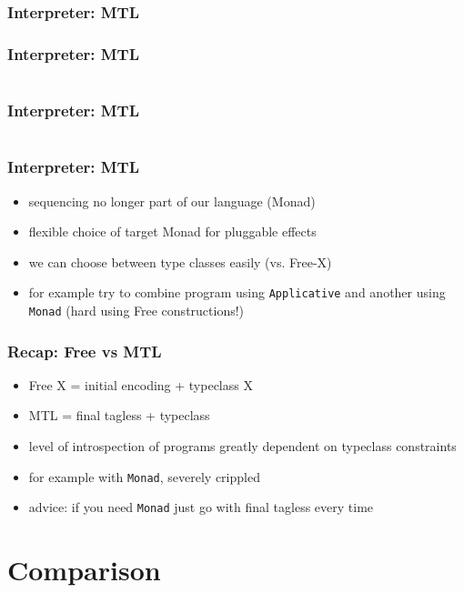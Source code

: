 \documentclass[aspectratio=169, hyperref={colorlinks, linkcolor=beamer@centricgreen}, urlcolor=links]{beamer}
\begin{document}
\begin{frame}
  \frametitle{Interpreter: MTL}
\end{frame}

\begin{frame}
  \frametitle{Interpreter: MTL}
  \inputminted[fontsize=\footnotesize]{scala}{snippets/final-mtl-sample.scala}
\end{frame}

\begin{frame}
  \frametitle{Interpreter: MTL}
  \inputminted[fontsize=\footnotesize]{scala}{snippets/final-mtl-interp.scala}
\end{frame}

\begin{frame}
  \frametitle{Interpreter: MTL}
  \begin{itemize}
  \item sequencing no longer part of our language (Monad)
  \item flexible choice of target Monad for pluggable effects
  \item we can choose between type classes easily (vs. Free-X)
  \item for example try to combine program using \texttt{Applicative}
    and another using \texttt{Monad} (hard using Free constructions!)
  \end{itemize}
\end{frame}

\begin{frame}
  \frametitle{Recap: Free vs MTL}
  \begin{itemize}
  \item Free X = initial encoding + typeclass X
  \item MTL = final tagless + typeclass
  \item level of introspection of programs greatly dependent on typeclass constraints
  \item for example with \texttt{Monad}, severely crippled
  \item advice: if you need \texttt{Monad} just go with final tagless every time
  \end{itemize}
\end{frame}

\section{Comparison}\label{sec:comparison}
\end{document}
